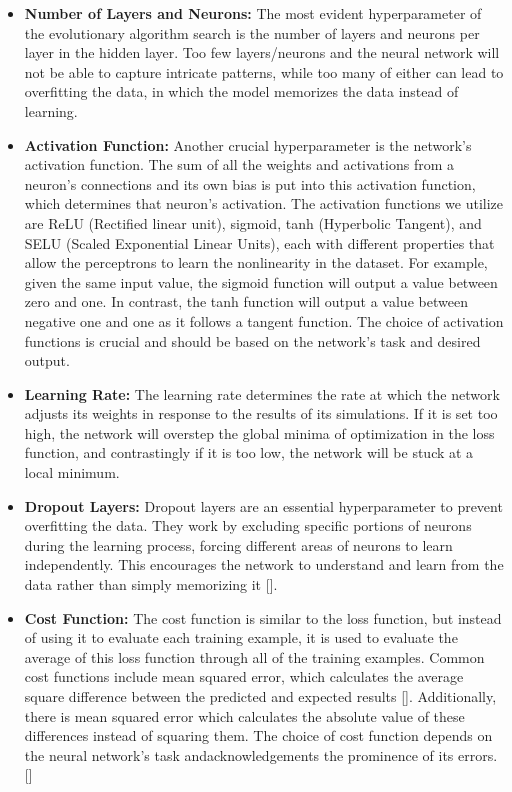 \begin{itemize}

    \item \textbf{Number of Layers and Neurons:} The most evident hyperparameter of the evolutionary algorithm search is the number of layers and neurons per layer in the hidden layer. Too few layers/neurons and the neural network will not be able to capture intricate patterns, while too many of either can lead to overfitting the data, in which the model memorizes the data instead of learning.
    
    \item \textbf{Activation Function:} Another crucial hyperparameter is the network's activation function. The sum of all the weights and activations from a neuron's connections and its own bias is put into this activation function, which determines that neuron's activation. The activation functions we utilize are ReLU (Rectified linear unit), sigmoid, tanh (Hyperbolic Tangent), and SELU (Scaled Exponential Linear Units), each with different properties that allow the perceptrons to learn the nonlinearity in the dataset. For example, given the same input value, the sigmoid function will output a value between zero and one. In contrast, the tanh function will output a value between negative one and one as it follows a tangent function. The choice of activation functions is crucial and should be based on the network's task and desired output. 


    \item \textbf{Learning Rate:} The learning rate determines the rate at which the network adjusts its weights in response to the results of its simulations. If it is set too high, the network will overstep the global minima of optimization in the loss function, and contrastingly if it is too low, the network will be stuck at a local minimum.

    \item \textbf{Dropout Layers:} Dropout layers are an essential hyperparameter to prevent overfitting the data. They work by excluding specific portions of neurons during the learning process, forcing different areas of neurons to learn independently. This encourages the network to understand and learn from the data rather than simply memorizing it [\cite{example6}].


    \item  \textbf{Cost Function:} The cost function is similar to the loss function, but instead of using it to evaluate each training example, it is used to evaluate the average of this loss function through all of the training examples. Common cost functions include mean squared error, which calculates the average square difference between the predicted and expected results [\cite{example1}]. Additionally, there is mean squared error which calculates the absolute value of these differences instead of squaring them. The choice of cost function depends on the neural network's task andacknowledgements the prominence of its errors. 
    [\cite{example9}]


\end{itemize}

